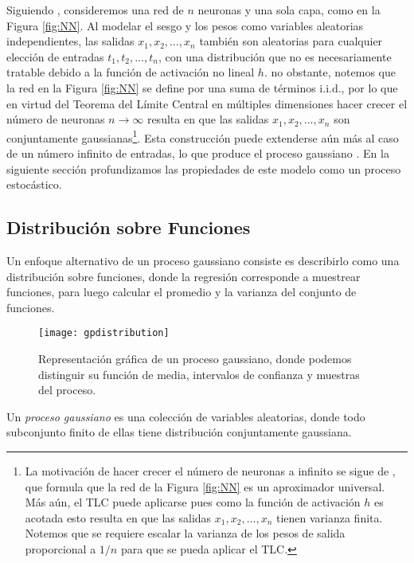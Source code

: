 Siguiendo \cite{rasmussen06,NIPS1996_1197,Neal:ARD}, consideremos una red de \(n\) neuronas y una sola capa, como en la Figura \ref{fig:NN}. Al modelar el sesgo y los pesos como variables aleatorias independientes, las salidas \(x_1, x_2, \dotsc, x_n\) también son aleatorias para cualquier elección de entradas \(t_1, t_2, \dotsc, t_n\), con una distribución que no es necesariamente tratable debido a la función de activación no lineal \(h\). no obstante, notemos que la red en la Figura \ref{fig:NN} se define por una suma de términos i.i.d., por lo que en virtud del Teorema del Límite Central en múltiples dimensiones \cite{araujo1980central} hacer crecer el número de neuronas \(n \to \infty\) resulta en que las salidas \(x_1, x_2, \dotsc, x_n\) son conjuntamente gaussianas\footnote{La motivación de hacer crecer el número de neuronas a infinito se sigue de \cite{Hornik:1993}, que formula que la red de la Figura \ref{fig:NN} es un aproximador universal. Más aún, el TLC puede aplicarse pues como la función de activación \(h\) es acotada esto resulta en que las salidas \(x_1, x_2, \dotsc, x_n\) tienen varianza finita. Notemos que se requiere escalar la varianza de los pesos de salida proporcional a \(1/n\) para que se pueda aplicar el TLC.}. Esta construcción puede extenderse aún más al caso de un número infinito de entradas, lo que produce el proceso gaussiano \cite{rasmussen06}. En la siguiente sección profundizamos las propiedades de este modelo como un proceso estocástico.

\subsection{Distribución sobre Funciones}

Un enfoque alternativo de un proceso gaussiano consiste es describirlo como una distribución sobre funciones, donde la regresión corresponde a muestrear funciones, para luego calcular el promedio y la varianza del conjunto de funciones.
\begin{figure}[h]
	\centering
	\texttt{[image: gpdistribution]}
	\caption{Representación gráfica de un proceso gaussiano, donde podemos distinguir su función de media, intervalos de confianza y muestras del proceso.}
\end{figure}

\begin{definition}
	Un \emph{proceso gaussiano} es una colección de variables aleatorias, donde todo subconjunto finito de ellas tiene distribución conjuntamente gaussiana.
\end{definition}


